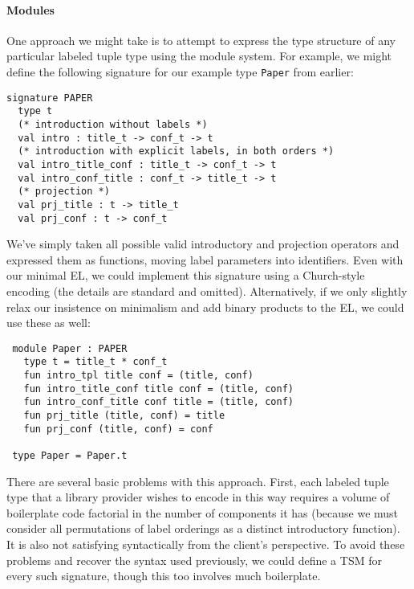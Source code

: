 \paragraph{Modules}
One approach we might take is to attempt to express the type structure of any particular labeled tuple type using the module system.  %
For example, we might define the following signature for our example type \lstinline{Paper} from earlier:
\begin{lstlisting}
signature PAPER
  type t
  (* introduction without labels *)
  val intro : title_t -> conf_t -> t
  (* introduction with explicit labels, in both orders *)
  val intro_title_conf : title_t -> conf_t -> t
  val intro_conf_title : conf_t -> title_t -> t
  (* projection *)
  val prj_title : t -> title_t
  val prj_conf : t -> conf_t
\end{lstlisting}
We've simply taken all possible valid introductory and projection operators and expressed them as functions, moving label parameters into identifiers. Even with our minimal EL, we could  implement this signature using a Church-style encoding (the details are standard and omitted). Alternatively, if we only slightly relax  our insistence on minimalism and add binary products to the EL, we could use these as well:
\begin{lstlisting}
 module Paper : PAPER
   type t = title_t * conf_t
   fun intro_tpl title conf = (title, conf)
   fun intro_title_conf title conf = (title, conf)
   fun intro_conf_title conf title = (title, conf)
   fun prj_title (title, conf) = title 
   fun prj_conf (title, conf) = conf
   
 type Paper = Paper.t
 \end{lstlisting}

There are several basic problems with this approach. First,  each labeled tuple type that a library provider wishes to encode in this way requires a volume of boilerplate code factorial in the number of components it has (because we must consider all permutations of label orderings as a distinct introductory function). It is also not satisfying syntactically from the client's perspective. To avoid these problems and recover the syntax used previously, we could define a TSM for every such signature, though this too involves much boilerplate.

